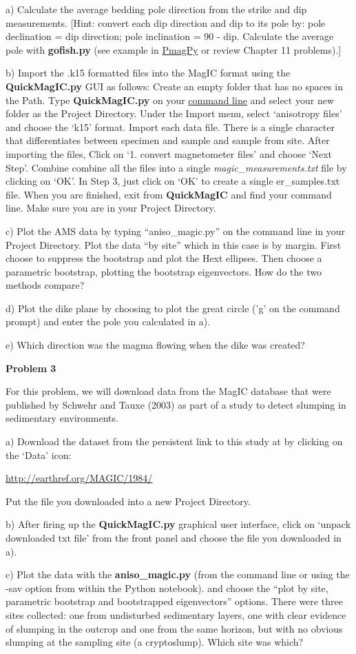 {a) Calculate the average bedding pole direction from the strike and dip measurements.  [Hint:  convert each dip direction and dip to its pole by: pole declination = dip direction; pole inclination = 90 - dip.
Calculate the average pole with {\bf gofish.py} (see example in \href{http://earthref.org/PmagPy/cookbook/#gofish.py}{PmagPy} or review Chapter 11 problems).]  

b)  Import the .k15 formatted files into the MagIC format using the {\bf QuickMagIC.py} GUI as follows:  Create an empty folder that has no spaces in the Path.   Type {\bf QuickMagIC.py} on your \href{http://earthref.org/PmagPy/cookbook/#command_line}{command  line} and select your new folder as the Project Directory.    Under the  Import menu, select `anisotropy files' and choose the   `k15' format.  Import each data file.  There is a single character that differentiates between specimen and sample and sample from site.  After importing the files, Click on  `1. convert magnetometer files'  and choose `Next Step'.  Combine combine all the files into a single {\it magic\_measurements.txt} file by clicking on `OK'.   In Step 3, just click on `OK' to create a single er\_samples.txt file.   When you are finished, exit from {\bf QuickMagIC} and find your command line.  Make sure you are in your Project Directory.  

c)   Plot the AMS data by typing ``aniso\_magic.py'' on the command line in your Project Directory.  Plot the data ``by site'' which in this case is by margin.  First choose to suppress the bootstrap and plot the Hext ellipses.  Then choose a parametric bootstrap, plotting the bootstrap eigenvectors.     How do the two methods compare?   


d) Plot the dike plane by choosing to plot the great circle  ('g' on the command prompt) and enter the pole you calculated in a).   

e) Which direction was the magma flowing when the dike was created?  


{\bf Problem 3}

For this problem, we will download data from the MagIC database that were published by Schwehr and Tauxe (2003) as part of a study to detect slumping in sedimentary environments.   
\nocite{schwehr03}

a)  Download the  dataset from  the persistent link to this study at by clicking on the `Data' icon:

\url{http://earthref.org/MAGIC/1984/}

Put the file you downloaded into a  new Project Directory.

b)   After firing up the {\bf QuickMagIC.py} graphical user interface, click on `unpack downloaded txt file' from the front panel and choose the file you downloaded in a). 

c) Plot the data with the {\bf aniso\_magic.py} (from the command line or using the -sav option from within the Python notebook).  and choose the  ``plot by site, parametric bootstrap and bootstrapped eigenvectors'' options.  There were three sites collected:  one from  undisturbed sedimentary layers,  one with clear evidence of slumping in the outcrop and one from the same horizon, but with no obvious slumping at the sampling site (a cryptoslump).  Which site was which?  
}
%
